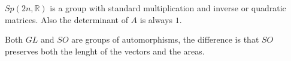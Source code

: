 \documentclass[misc]{subfiles}
\begin{document}
\begin{Prp}
    $Sp(2n,\mathbb{R})$ is a group with standard multiplication and inverse or quadratic matrices. Also the determinant of $A$ is always $1$.
\end{Prp}

\begin{Rmk}
    Both $GL$ and $SO$ are groups of automorphisms, the difference is that $SO$ preserves both the lenght of the vectors and the areas.
\end{Rmk}
\end{document}
